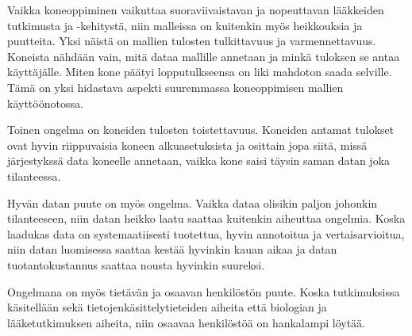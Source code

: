 \documentclass[finnish,twoside,censored,essay,sw-line]{HYthesisML}
\begin{document}
Vaikka koneoppiminen vaikuttaa suoraviivaistavan ja nopeuttavan lääkkeiden tutkimusta ja -kehitystä, niin
malleissa on kuitenkin myös heikkouksia ja puutteita. Yksi näistä on mallien tulosten tulkittavuus ja varmennettavuus.
Koneista nähdään vain, mitä dataa mallille annetaan ja minkä tuloksen se antaa käyttäjälle. Miten kone päätyi
lopputulkseensa on liki mahdoton saada selville. Tämä on yksi hidastava aspekti suuremmassa koneoppimisen mallien
käyttöönotossa.

Toinen ongelma on koneiden tulosten toistettavuus. Koneiden antamat tulokset ovat hyvin riippuvaisia koneen
alkuasetuksista ja osittain jopa siitä, missä järjestykssä data koneelle annetaan, vaikka kone saisi täysin
saman datan joka tilanteessa.

Hyvän datan puute on myös ongelma. Vaikka dataa olisikin paljon johonkin tilanteeseen, niin datan heikko laatu
saattaa kuitenkin aiheuttaa ongelmia. Koska laadukas data on systemaatiisesti tuotettua, hyvin annotoitua ja
vertaisarvioitua, niin datan luomisessa saattaa kestää hyvinkin kauan aikaa ja datan tuotantokustannus saattaa
nousta hyvinkin suureksi.

Ongelmana on myös tietävän ja osaavan henkilöstön puute. Koska tutkimuksissa käsitellään sekä tietojenkäsittelytieteiden
aiheita että biologian ja lääketutkimuksen aiheita, niin osaavaa henkilöstöä on hankalampi löytää.

\cleardoublepage
{}
{}
\printbibliography

\backmatter
\end{document}
